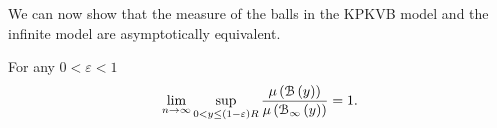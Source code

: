 We can now show that the measure of the balls in the KPKVB model and the infinite model are asymptotically equivalent.

\begin{lemma}\label{lem:average_degree_hyperbolic}
For any $0 < \varepsilon < 1$
\[
	\lim_{n \to \infty} \sup_{0 < y \le (1-\varepsilon)R} \frac{\mu\left({\mathcal B}\left(y\right)\right)}{\mu\left({\mathcal B}_{\infty}\left(y\right)\right)} = 1.
\]
\end{lemma}

